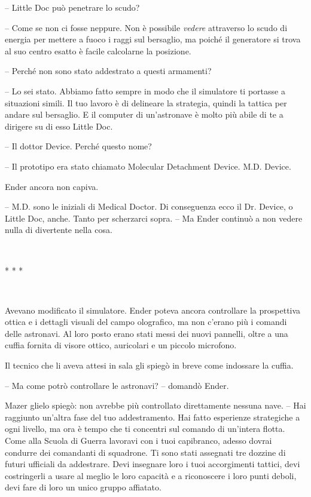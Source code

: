 {-- Little Doc può penetrare lo scudo?}

{-- Come se non ci fosse neppure. Non è possibile \emph{vedere}
	attraverso lo scudo di energia per mettere a fuoco i raggi sul
	bersaglio, ma poiché il generatore si trova al suo centro esatto è
	facile calcolarne la posizione.}

{-- Perché non sono stato addestrato a questi armamenti?}

{-- Lo sei stato. Abbiamo fatto sempre in modo che il simulatore ti
	portasse a situazioni simili. Il tuo lavoro è di delineare la strategia,
	quindi la tattica per andare sul bersaglio. E il computer di
	un'astronave è molto più abile di te a dirigere su di esso Little Doc.}

{-- Il dottor Device. Perché questo nome?}

{-- Il prototipo era stato chiamato Molecular Detachment Device. M.D.
	Device.}

{Ender ancora non capiva.}

{-- M.D. sono le iniziali di Medical Doctor. Di conseguenza ecco il Dr.
	Device, o Little Doc, anche. Tanto per scherzarci sopra. -- Ma Ender
	continuò a non vedere nulla di divertente nella cosa.}

{~}

\begin{center}
	{* * *}
\end{center}

{~}

{Avevano modificato il simulatore. Ender poteva ancora controllare la
	prospettiva ottica e i dettagli visuali del campo olografico, ma non
	c'erano più i comandi delle astronavi. Al loro posto erano stati messi
	dei nuovi pannelli, oltre a una cuffia fornita di visore ottico,
	auricolari e un piccolo microfono.}

{Il tecnico che li aveva attesi in sala gli spiegò in breve come
	indossare la cuffia.}

{-- Ma come potrò controllare le astronavi? -- domandò Ender.}

{Mazer glielo spiegò: non avrebbe più controllato direttamente nessuna
	nave. -- Hai raggiunto un'altra fase del tuo addestramento. Hai fatto
	esperienze strategiche a ogni livello, ma ora è tempo che ti concentri
	sul comando di un'intera flotta. Come alla Scuola di Guerra lavoravi con
	i tuoi capibranco, adesso dovrai condurre dei comandanti di squadrone.
	Ti sono stati assegnati tre dozzine di futuri ufficiali da addestrare.
	Devi insegnare loro i tuoi accorgimenti tattici, devi costringerli a
	usare al meglio le loro capacità e a riconoscere i loro punti deboli,
	devi fare di loro un unico gruppo affiatato.}

